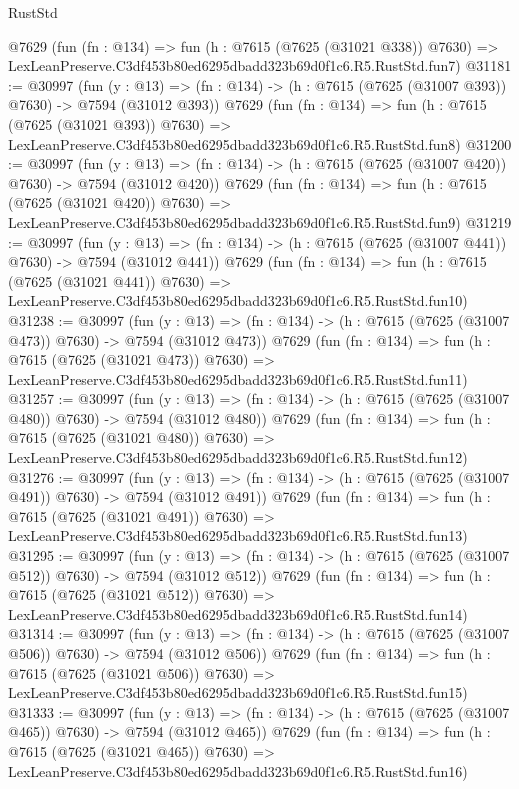 \begin{lexlean}{RustStd}
\begin{coremodule}
    @7629
    (fun (fn : @134) =>
    fun (h : @7615 (@7625 (@31021 @338)) @7630) =>
    LexLeanPreserve.C3df453b80ed6295dbadd323b69d0f1c6.R5.RustStd.fun7)
@31181 := @30997
    (fun (y : @13) => (fn : @134) -> (h : @7615 (@7625 (@31007 @393)) @7630) -> @7594 (@31012 @393))
    @7629
    (fun (fn : @134) =>
    fun (h : @7615 (@7625 (@31021 @393)) @7630) =>
    LexLeanPreserve.C3df453b80ed6295dbadd323b69d0f1c6.R5.RustStd.fun8)
@31200 := @30997
    (fun (y : @13) => (fn : @134) -> (h : @7615 (@7625 (@31007 @420)) @7630) -> @7594 (@31012 @420))
    @7629
    (fun (fn : @134) =>
    fun (h : @7615 (@7625 (@31021 @420)) @7630) =>
    LexLeanPreserve.C3df453b80ed6295dbadd323b69d0f1c6.R5.RustStd.fun9)
@31219 := @30997
    (fun (y : @13) => (fn : @134) -> (h : @7615 (@7625 (@31007 @441)) @7630) -> @7594 (@31012 @441))
    @7629
    (fun (fn : @134) =>
    fun (h : @7615 (@7625 (@31021 @441)) @7630) =>
    LexLeanPreserve.C3df453b80ed6295dbadd323b69d0f1c6.R5.RustStd.fun10)
@31238 := @30997
    (fun (y : @13) => (fn : @134) -> (h : @7615 (@7625 (@31007 @473)) @7630) -> @7594 (@31012 @473))
    @7629
    (fun (fn : @134) =>
    fun (h : @7615 (@7625 (@31021 @473)) @7630) =>
    LexLeanPreserve.C3df453b80ed6295dbadd323b69d0f1c6.R5.RustStd.fun11)
@31257 := @30997
    (fun (y : @13) => (fn : @134) -> (h : @7615 (@7625 (@31007 @480)) @7630) -> @7594 (@31012 @480))
    @7629
    (fun (fn : @134) =>
    fun (h : @7615 (@7625 (@31021 @480)) @7630) =>
    LexLeanPreserve.C3df453b80ed6295dbadd323b69d0f1c6.R5.RustStd.fun12)
@31276 := @30997
    (fun (y : @13) => (fn : @134) -> (h : @7615 (@7625 (@31007 @491)) @7630) -> @7594 (@31012 @491))
    @7629
    (fun (fn : @134) =>
    fun (h : @7615 (@7625 (@31021 @491)) @7630) =>
    LexLeanPreserve.C3df453b80ed6295dbadd323b69d0f1c6.R5.RustStd.fun13)
@31295 := @30997
    (fun (y : @13) => (fn : @134) -> (h : @7615 (@7625 (@31007 @512)) @7630) -> @7594 (@31012 @512))
    @7629
    (fun (fn : @134) =>
    fun (h : @7615 (@7625 (@31021 @512)) @7630) =>
    LexLeanPreserve.C3df453b80ed6295dbadd323b69d0f1c6.R5.RustStd.fun14)
@31314 := @30997
    (fun (y : @13) => (fn : @134) -> (h : @7615 (@7625 (@31007 @506)) @7630) -> @7594 (@31012 @506))
    @7629
    (fun (fn : @134) =>
    fun (h : @7615 (@7625 (@31021 @506)) @7630) =>
    LexLeanPreserve.C3df453b80ed6295dbadd323b69d0f1c6.R5.RustStd.fun15)
@31333 := @30997
    (fun (y : @13) => (fn : @134) -> (h : @7615 (@7625 (@31007 @465)) @7630) -> @7594 (@31012 @465))
    @7629
    (fun (fn : @134) =>
    fun (h : @7615 (@7625 (@31021 @465)) @7630) =>
    LexLeanPreserve.C3df453b80ed6295dbadd323b69d0f1c6.R5.RustStd.fun16)

\end{coremodule}
\end{lexlean}
